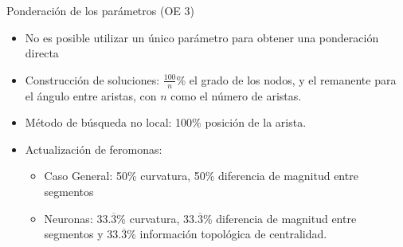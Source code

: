 \begin{frame}{Ponderaci\'on de los par\'ametros (OE 3)}

    \begin{itemize}%
    \item No es posible utilizar un \'unico par\'ametro para obtener una ponderaci\'on directa
    \item Construcci\'on de soluciones: $\frac{100}{n}$\% el grado de los nodos, y el remanente para el \'angulo entre aristas, con $n$ como el n\'umero de aristas.
    \item M\'etodo de b\'usqueda no local: 100\% posici\'on de la arista.
    \item Actualizaci\'on de feromonas: 
    \begin{itemize}%
        \item Caso General: 50\% curvatura, 50\% diferencia de magnitud entre segmentos
        \item Neuronas: $33.\overline{3}\%$ curvatura, $33.\overline{3}\%$ diferencia de magnitud entre segmentos y $33.\overline{3}\%$ informaci\'on topol\'ogica de centralidad.
    \end{itemize}
\end{itemize}
\end{frame}


